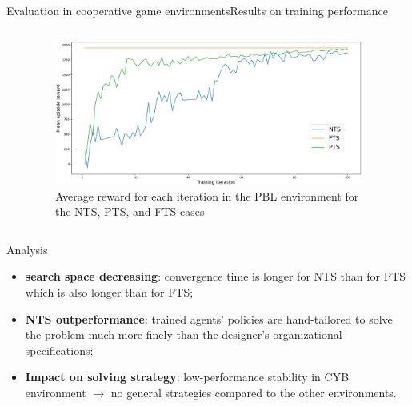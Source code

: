 \begin{frame}[allowframebreaks]{Evaluation in cooperative game environments}{Results on training performance}

    \begin{columns}

        \begin{column}{0.3\textwidth}
            { \tiny
                }

        \end{column}

        \hspace{1ex}

        \begin{column}{0.7\textwidth}
            \begin{figure}[h!]
                \centering
                \includegraphics[width=0.95\textwidth]{figures/prahom_learning_curve.png}
                \caption{Average reward for each iteration in the PBL environment for the NTS, PTS, and FTS cases}
                \label{fig:prahom_learning_curve}
            \end{figure}
        \end{column}

    \end{columns}

    \begin{block}{Analysis}

        \begin{itemize}
            \item \textbf{search space decreasing}: convergence time is longer for NTS than for PTS which is also longer than for FTS;
            \item \textbf{NTS outperformance}: trained agents' policies are hand-tailored to solve the problem much more finely than the designer's organizational specifications;
            \item \textbf{Impact on solving strategy}: low-performance stability in CYB environment $\rightarrow$ no general strategies compared to the other environments.
        \end{itemize}

    \end{block}

\end{frame}


